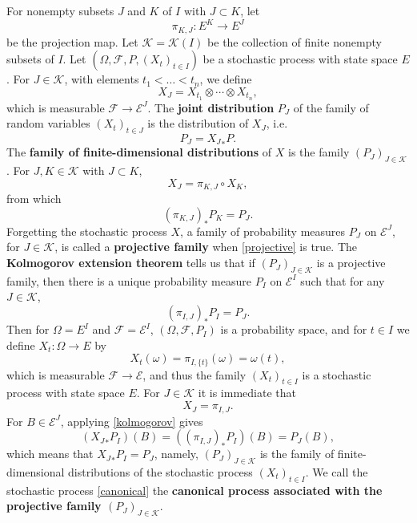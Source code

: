 \documentclass{article}
\theoremstyle{definition}
\begin{document}
For nonempty subsets $J$ and $K$ of $I$ with $J \subset K$, let
\[
\pi_{K,J}:E^K \to E^J
\]
be the projection map. 
Let $\mathscr{K}=\mathscr{K}(I)$ be the collection of finite nonempty subsets of $I$.
Let $(\Omega,\mathscr{F},P,(X_t)_{t \in I})$ be
a stochastic process 
with state space $E$.
For $J \in \mathscr{K}$, with elements $t_1<\ldots<t_n$, we define
\[
X_J = X_{t_1} \otimes \cdots \otimes X_{t_n},
\]
which is measurable $\mathscr{F} \to \mathscr{E}^J$. 
The \textbf{joint distribution} $P_J$ of the family of random variables
$(X_t)_{t \in J}$ is the distribution of $X_J$, i.e.
\[
P_J={X_J}_*P.
\]
The \textbf{family of finite-dimensional distributions} of $X$ is the family $(P_J)_{J \in \mathscr{K}}$. 
For $J,K \in \mathscr{K}$ with $J \subset K$,
\[
X_J = \pi_{K,J} \circ X_K,
\]
from which
\begin{equation}
(\pi_{K,J})_* P_K = P_J.
\label{projective}
\end{equation}
Forgetting the stochastic process $X$, a family of probability measures $P_J$ on $\mathscr{E}^J$, for $J \in \mathscr{K}$,
is called a \textbf{projective family} when \eqref{projective} is true. The \textbf{Kolmogorov extension theorem}
tells us that if $(P_J)_{J \in \mathscr{K}}$ is a projective family, then there is a unique probability measure $P_I$
on $\mathscr{E}^I$ such that for any $J \in \mathscr{K}$,
\begin{equation}
(\pi_{I,J})_*P_I = P_J.
\label{kolmogorov}
\end{equation}
Then for $\Omega=E^I$ and $\mathscr{F}=\mathscr{E}^I$, $(\Omega,\mathscr{F},P_I)$ is a probability space, and for
$t \in I$ we define $X_t:\Omega \to E$ by
\begin{equation}
X_t(\omega) =\pi_{I,\{t\}}(\omega)= \omega(t),
\label{canonical}
\end{equation}
which is measurable $\mathscr{F} \to \mathscr{E}$, and thus the family $(X_t)_{t \in I}$ is a stochastic process with state space
$E$. For $J \in \mathscr{K}$ it is immediate that
\[
X_J = \pi_{I,J}.
\]
For $B \in \mathscr{E}^J$, applying \eqref{kolmogorov} gives
\[
({X_J}_*P_I)(B) = ((\pi_{I,J})_*P_I)(B) =P_J(B), 
\]
which means that ${X_J}_*P_I=P_J$, namely, $(P_J)_{J \in \mathscr{K}}$
is the family of finite-dimensional distributions of the stochastic process $(X_t)_{t \in I}$.
We call the stochastic process \eqref{canonical} the \textbf{canonical process associated with the projective family
$(P_J)_{J \in \mathscr{K}}$}.
\end{document}
